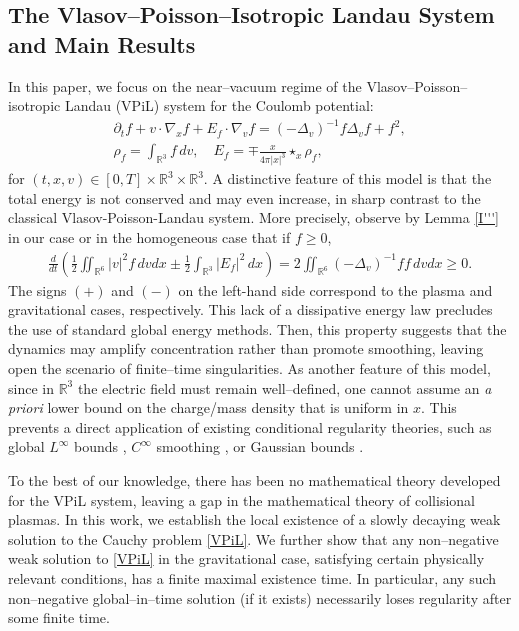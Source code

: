 \documentclass[reqno,11pt,final]{amsart}
\theoremstyle{plain}
\numberwithin{equation}{section}
\numberwithin{theorem}{section}
\begin{document}
\subsection{The Vlasov–Poisson–Isotropic Landau System and Main Results}
In this paper, we focus on the near--vacuum regime of the Vlasov--Poisson--isotropic Landau (VPiL) system for the Coulomb potential:
\begin{equation}
    \begin{gathered}
        \partial_tf + v\cdot\nabla_xf + E_f\cdot\nabla_vf = (-\Delta_v)^{-1}f\Delta_vf + f^2,\tag{VPiL}\\
        \rho_f = \int_{\mathbb{R}^3} f\,dv, \quad E_f = \mp\frac{x}{4\pi|x|^3} \star_x\rho_f, \nonumber
    \end{gathered}
\end{equation}for $(t,x,v)\in[0,T]\times\mathbb{R}^3\times\mathbb{R}^3$.
A distinctive feature of this model is that the total energy is not conserved and may even increase, in sharp contrast to the classical Vlasov-Poisson-Landau system. More precisely, observe by Lemma \ref{I'''} in our case or \cite{iL_Gualdani_2016} in the homogeneous case that if $f\ge0$,
\begin{align*}
    \frac{d}{dt}\left(\frac{1}{2}\iint_{\mathbb{R}^6} |v|^2f\,dvdx  \pm \frac{1}{2}\int_{\mathbb{R}^3} |E_f|^2\,dx\right) = 2\iint_{\mathbb{R}^6} (-\Delta_v)^{-1}ff\,dvdx\ge0.
\end{align*}The signs $(+)$ and $(-)$ on the left-hand side correspond to the plasma and gravitational cases, respectively. This lack of a dissipative energy law precludes the use of standard global energy methods. Then, this property suggests that the dynamics may amplify concentration rather than promote smoothing, leaving open the scenario of finite--time singularities. As another feature of this model, since in $\mathbb{R}^3$ the electric field must remain well--defined, one cannot assume an \textit{a priori} lower bound on the charge/mass density that is uniform in $x$. This prevents a direct application of existing conditional regularity theories, such as global $L^\infty$ bounds \cite{IHL_Cameron_2018}, $C^\infty$ smoothing \cite{IHL_Henderson_2019}, or Gaussian bounds \cite{IHL_Snelson_2018}.

To the best of our knowledge, there has been no mathematical theory developed for the VPiL system, leaving a gap in the mathematical theory of collisional plasmas. In this work, we establish the local existence of a slowly decaying weak solution to the Cauchy problem \eqref{VPiL}. We further show that any non--negative weak solution to \eqref{VPiL} in the gravitational case, satisfying certain physically relevant conditions, has a finite maximal existence time. In particular, any such non--negative global--in--time solution (if it exists) necessarily loses regularity after some finite time.
\end{document}
